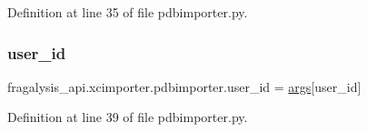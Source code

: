 Definition at line 35 of file pdbimporter.\+py.

\mbox{\label{namespacefragalysis__api_1_1xcimporter_1_1pdbimporter_a9cee2acc4fc991cee1a09431247027f9}} 
\subsubsection{\texorpdfstring{user\+\_\+id}{user\_id}}
{\footnotesize\ttfamily fragalysis\+\_\+api.\+xcimporter.\+pdbimporter.\+user\+\_\+id = \hyperlink{namespacefragalysis__api_1_1xcimporter_1_1pdbimporter_a98658023f7019ff38aa6fc1beb1be986}{args}\mbox{[}\textquotesingle{}user\+\_\+id\textquotesingle{}\mbox{]}}



Definition at line 39 of file pdbimporter.\+py.

